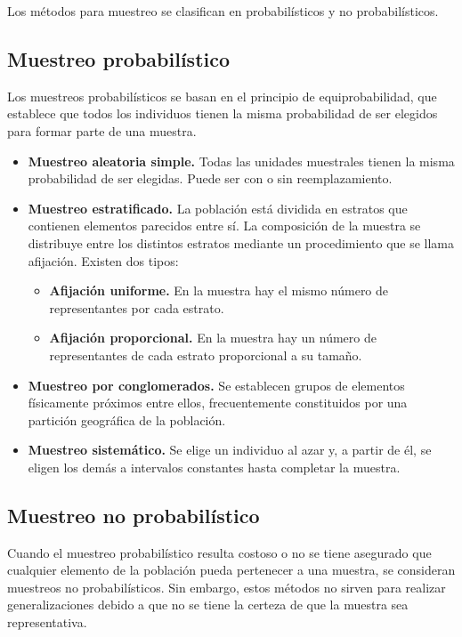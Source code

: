 Los métodos para muestreo se clasifican en probabilísticos y no probabilísticos.

\subsection{Muestreo probabilístico}
Los muestreos probabilísticos se basan en el principio de equiprobabilidad, que establece que todos los individuos tienen la misma probabilidad de ser elegidos para formar parte de una muestra.
\begin{itemize}
    \item \textbf{Muestreo aleatoria simple.}
          Todas las unidades muestrales tienen la misma probabilidad de ser elegidas.
          Puede ser con o sin reemplazamiento.

    \item \textbf{Muestreo estratificado.}
          La población está dividida en estratos que contienen elementos parecidos entre sí.
          La composición de la muestra se distribuye entre los distintos estratos mediante un procedimiento que se llama afijación.
          Existen dos tipos:
          \begin{itemize}
              \item \textbf{Afijación uniforme.}
                    En la muestra hay el mismo número de representantes por cada estrato.
              \item \textbf{Afijación proporcional.}
                    En la muestra hay un número de representantes de cada estrato proporcional a su tamaño.
          \end{itemize}

    \item \textbf{Muestreo por conglomerados.}
          Se establecen grupos de elementos físicamente próximos entre ellos, frecuentemente constituidos por una partición geográfica de la población.

    \item \textbf{Muestreo sistemático.}
          Se elige un individuo al azar y, a partir de él, se eligen los demás a intervalos constantes hasta completar la muestra.
\end{itemize}

\subsection{Muestreo no probabilístico}
Cuando el muestreo probabilístico resulta costoso o no se tiene asegurado que cualquier elemento de la población pueda pertenecer a una muestra, se consideran muestreos no probabilísticos.
Sin embargo, estos métodos no sirven para realizar generalizaciones debido a que no se tiene la certeza de que la muestra sea representativa.

